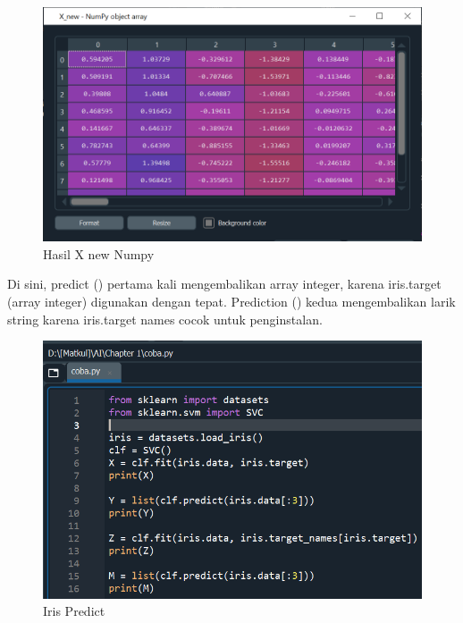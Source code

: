     \begin{figure}[H]
    \centering
    \includegraphics[width=13cm]{figures/chapter1/18.PNG}
    \caption{Hasil X new Numpy}
    \end{figure}
    
\par Di sini, predict () pertama kali mengembalikan array integer, karena iris.target (array integer) digunakan dengan tepat. Prediction () kedua mengembalikan larik string karena iris.target names cocok untuk penginstalan.

    \begin{figure}[H]
    \centering
    \includegraphics[width=13cm]{figures/chapter1/22.PNG}
    \caption{Iris Predict}
    \end{figure}

